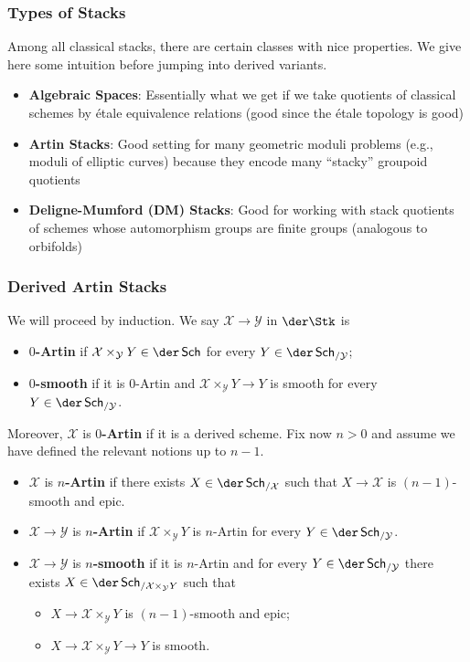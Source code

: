 \documentclass[11pt]{beamer}
\newcommand{\X}{\mathcal{X}}
\newcommand{\Y}{\mathcal{Y}}
\begin{document}
\begin{frame}
\frametitle{Types of Stacks}
\pause Among all classical stacks, there are certain classes with nice properties. We give here some intuition before jumping into derived variants.
\begin{itemize}
\pause\item \textbf{Algebraic Spaces}: Essentially what we get if we take quotients of classical schemes by \'{e}tale equivalence relations (good since the \'{e}tale topology is good)
\pause\item \textbf{Artin Stacks}: Good setting for many geometric moduli problems (e.g., moduli of elliptic curves) because they encode many ``stacky'' groupoid quotients
\pause\item \textbf{Deligne-Mumford (DM) Stacks}: Good for working with stack quotients of schemes whose automorphism groups are finite groups (analogous to orbifolds)
\end{itemize}
\end{frame}

\begin{frame}
\frametitle{Derived Artin Stacks}
\pause We will proceed by induction. We say $\X\to\Y$ in $\der\Stk$ is 
\begin{itemize}
\pause\item \textbf{$0$-Artin} if $\X\times_{\Y}Y\in\der\Sch$ for every $Y\in\der\Sch_{/\Y}$;
\pause\item \textbf{$0$-smooth} if it is $0$-Artin and $\X\times_{\Y}Y\to Y$ is smooth for every $Y\in\der\Sch_{/\Y}$.
\end{itemize}
\pause Moreover, $\X$ is \textbf{$0$-Artin} if it is a derived scheme. \pause Fix now $n>0$ and assume we have defined the relevant notions up to $n-1$.
\begin{itemize}
\pause\item $\X$ is \textbf{$n$-Artin} if there exists $X\in\der\Sch_{/\X}$ such that $X\to\X$ is $(n-1)$-smooth and epic.
\pause\item $\X\to\Y$ is \textbf{$n$-Artin} if $\X\times_{\Y}Y$ is $n$-Artin for every $Y\in\der\Sch_{/\Y}$.
\pause\item $\X\to\Y$ is \textbf{$n$-smooth} if it is $n$-Artin and for every $Y\in\der\Sch_{/\Y}$ there exists $X\in\der\Sch_{/\X\times_{\Y}Y}$ such that 
\begin{itemize}
	\pause\item $X\to\X\times_{\Y}Y$ is $(n-1)$-smooth and epic;
	\pause\item $X\to\X\times_{\Y}Y\to Y$ is smooth.
\end{itemize}
\end{itemize}
\end{frame}
\end{document}
